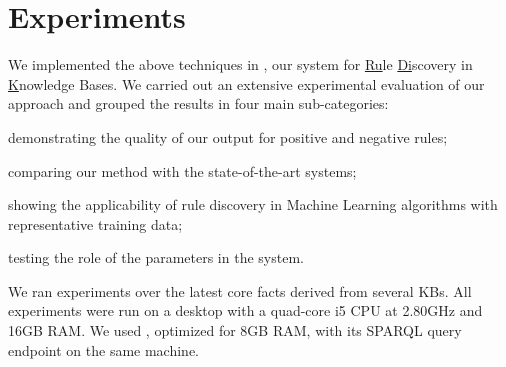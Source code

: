 \section{Experiments} \label{sec:krd_experiments}
We implemented the above techniques in \krd, our system for \underline{Ru}le \underline{Di}scovery in \underline{K}nowledge Bases.
We carried out an extensive experimental evaluation of our approach and grouped the results in four main sub-categories: 
\begin{inparaenum}[\itshape(i)]
	\item demonstrating the quality of our output for positive and negative rules;
	\item comparing our method with the state-of-the-art systems;
	\item showing the applicability of rule discovery in Machine Learning algorithms with representative training data;
	\item testing the role of the parameters in the system. %
\end{inparaenum}

We ran experiments over the latest core facts derived from several KBs. All experiments were run on a desktop with a quad-core i5 CPU at 2.80GHz and 16GB RAM. We used , optimized for 8GB RAM, with its SPARQL query endpoint on the same machine.

